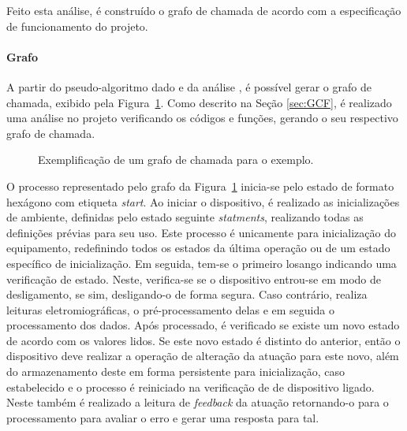          Feito esta análise, é construído o grafo de chamada de acordo com a especificação de funcionamento do projeto.

      \paragraph{Grafo}
         A partir do pseudo-algoritmo dado e da análise \profile, é possível gerar o grafo de chamada, exibido pela Figura~\ref{fig:graph_w1}.
         Como descrito na Seção \ref{sec:GCF}, é realizado uma análise no projeto verificando os códigos e funções, gerando o seu respectivo grafo de chamada.

         \begin{figure}[h] \centering
            \caption{Exemplificação de um grafo de chamada para o exemplo.}
            \label{fig:graph_w1}
         \end{figure}

         O processo representado pelo grafo da Figura~\ref{fig:graph_w1} inicia-se pelo estado de formato hexágono com etiqueta \textit{start}.
         Ao iniciar o dispositivo, é realizado as inicializações de ambiente, definidas pelo estado seguinte \textit{statments}, realizando todas as definições prévias para seu uso.
         Este processo é unicamente para inicialização do equipamento, redefinindo todos os estados da última operação ou de um estado específico de inicialização.
         Em seguida, tem-se o primeiro losango indicando uma verificação de estado.
         Neste, verifica-se se o dispositivo entrou-se em modo de desligamento, se sim, desligando-o de forma segura.
         Caso contrário, realiza leituras eletromiográficas, o pré-processamento delas e em seguida o processamento dos dados.
         Após processado, é verificado se existe um novo estado de acordo com os valores lidos.
         Se este novo estado é distinto do anterior, então o dispositivo deve realizar a operação de alteração da atuação para este novo, além do armazenamento deste em forma persistente para inicialização, caso estabelecido e o processo é reiniciado na verificação de de dispositivo ligado.
         Neste também é realizado a leitura de \textit{feedback} da atuação retornando-o para o processamento para avaliar o erro e gerar uma resposta para tal.

